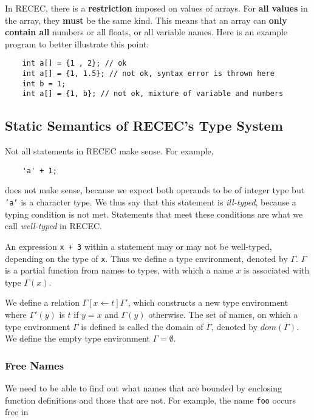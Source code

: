 \documentclass[a4paper]{article}
\begin{document}
In RECEC, there is a \textbf{restriction} imposed on values of arrays. For \textbf{all values} in the array, they \textbf{must} be the same kind. This means that an array can \textbf{only contain all} numbers or all floats, or all variable names. Here is an example program to better illustrate this point:

\begin{verbatim}
	int a[] = {1 , 2}; // ok
	int a[] = {1, 1.5}; // not ok, syntax error is thrown here 
	int b = 1;
	int a[] = {1, b}; // not ok, mixture of variable and numbers
\end{verbatim}


\subsection{Static Semantics of RECEC's Type System}

Not all statements in RECEC make sense. For example,

\begin{verbatim}
    'a' + 1;
\end{verbatim}

does not make sense, because we expect both operands to be of integer type but \texttt{'a'} is a character type. 
We thus say that this statement is \textit{ill-typed}, because a typing condition is not met.
Statements that meet these conditions are what we call \textit{well-typed} in RECEC.

An expression \verb|x + 3| within a statement may or may not be well-typed, depending on the type of \verb|x|.
Thus we define a type environment, denoted by $\Gamma$.
$\Gamma$ is a partial function from names to types, with which a name $x$ is associated with type $\Gamma(x)$.

We  define a relation $\Gamma[x\leftarrow t]\Gamma'$, which constructs a new type environment where $\Gamma'(y)$ is $t$ if $y=x$ and $\Gamma(y)$ otherwise.
The set of names, on which a type environment $\Gamma$ is defined is called the domain of $\Gamma$, denoted by $dom(\Gamma)$.
We define the empty type environment $\Gamma=\emptyset$.

\subsubsection{Free Names}

We need to be able to find out what names that are bounded by enclosing function definitions and those that are not. For example, the name \texttt{foo} occurs free in
\end{document}
